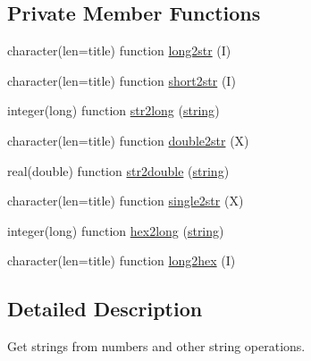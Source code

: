 \subsection*{Private Member Functions}
\begin{DoxyCompactItemize}
\item 
character(len=title) function \hyperlink{classstring_a734300e2e50f76efa2730b5f1cc7cc21}{long2str} (I)
\item 
character(len=title) function \hyperlink{classstring_ac3e429fd86c78765b2408096ae132f8a}{short2str} (I)
\item 
integer(long) function \hyperlink{classstring_aefd9037a03dddf650cb9d0a18ed7de95}{str2long} (\hyperlink{classstring}{string})
\item 
character(len=title) function \hyperlink{classstring_a229fed3adef608ec305da7cbc54b24a8}{double2str} (X)
\item 
real(double) function \hyperlink{classstring_a73d6072e501eb7ed3d5aa9e4a5a47f6d}{str2double} (\hyperlink{classstring}{string})
\item 
character(len=title) function \hyperlink{classstring_a78ede8e0d165537ea978aeeb8227bc3f}{single2str} (X)
\item 
integer(long) function \hyperlink{classstring_a133490e9f060a404b52108895b255435}{hex2long} (\hyperlink{classstring}{string})
\item 
character(len=title) function \hyperlink{classstring_a58fb75f0ded0856267e7770d4b13b2f6}{long2hex} (I)
\end{DoxyCompactItemize}


\subsection{Detailed Description}
Get strings from numbers and other string operations. 


